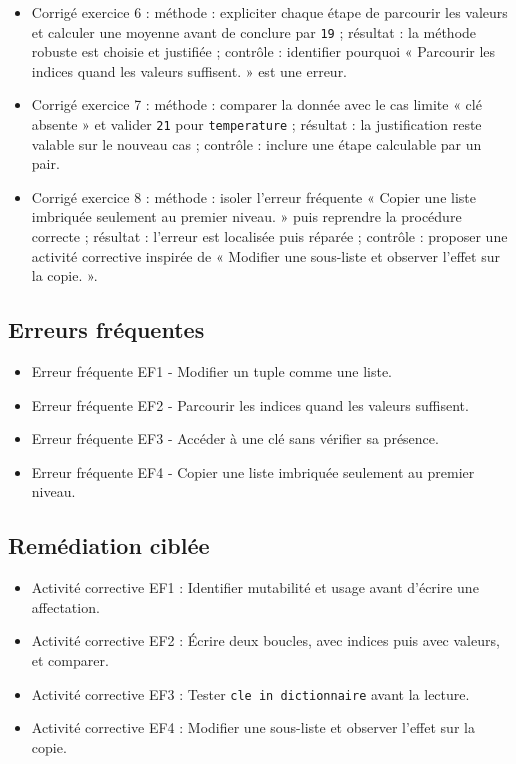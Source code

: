 \begin{itemize}
  la donnée minimale et la conclusion.
\item
  Corrigé exercice 6 : méthode : expliciter chaque étape de parcourir
  les valeurs et calculer une moyenne avant de conclure par \texttt{19}
  ; résultat : la méthode robuste est choisie et justifiée ; contrôle :
  identifier pourquoi « Parcourir les indices quand les valeurs
  suffisent. » est une erreur.
\item
  Corrigé exercice 7 : méthode : comparer la donnée avec le cas limite «
  clé absente » et valider \texttt{21} pour \texttt{temperature} ;
  résultat : la justification reste valable sur le nouveau cas ;
  contrôle : inclure une étape calculable par un pair.
\item
  Corrigé exercice 8 : méthode : isoler l'erreur fréquente « Copier une
  liste imbriquée seulement au premier niveau. » puis reprendre la
  procédure correcte ; résultat : l'erreur est localisée puis réparée ;
  contrôle : proposer une activité corrective inspirée de « Modifier une
  sous-liste et observer l'effet sur la copie. ».
\end{itemize}

\subsection{Erreurs fréquentes}

\begin{itemize}
\tightlist
\item
  Erreur fréquente EF1 - Modifier un tuple comme une liste.
\item
  Erreur fréquente EF2 - Parcourir les indices quand les valeurs
  suffisent.
\item
  Erreur fréquente EF3 - Accéder à une clé sans vérifier sa présence.
\item
  Erreur fréquente EF4 - Copier une liste imbriquée seulement au premier
  niveau.
\end{itemize}

\subsection{Remédiation ciblée}

\begin{itemize}
\tightlist
\item
  Activité corrective EF1 : Identifier mutabilité et usage avant
  d'écrire une affectation.
\item
  Activité corrective EF2 : Écrire deux boucles, avec indices puis avec
  valeurs, et comparer.
\item
  Activité corrective EF3 : Tester \texttt{cle\ in\ dictionnaire} avant
  la lecture.
\item
  Activité corrective EF4 : Modifier une sous-liste et observer l'effet
  sur la copie.
\end{itemize}

